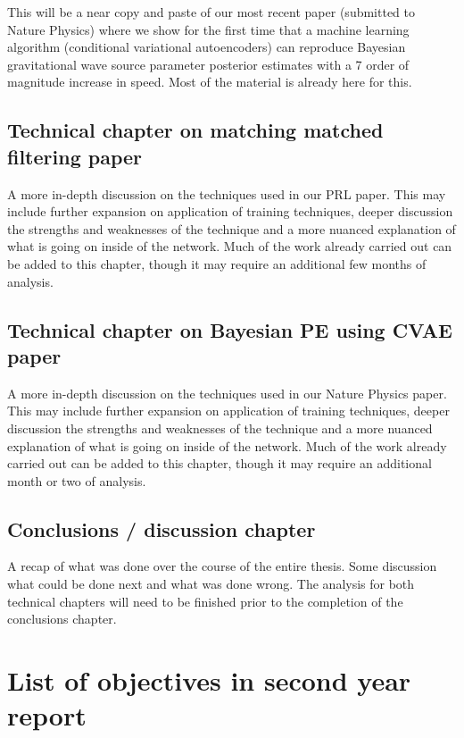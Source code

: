 This will be a near copy and paste of our most recent paper (submitted to Nature Physics) where we show for the first time that a machine learning algorithm (conditional variational autoencoders) can reproduce Bayesian gravitational wave source parameter posterior estimates with a 7 order of magnitude increase in speed. Most of the material is already here for this.

\section{Technical chapter on matching matched filtering paper}

A more in-depth discussion on the techniques used in our PRL paper. This may include further expansion on application of training techniques, deeper discussion the strengths and weaknesses of the technique and a more nuanced explanation of what is going on inside of the network. Much of the work already carried out can be added to this chapter, though it may require an additional few months of analysis.

\section{Technical chapter on Bayesian PE using CVAE paper}

A more in-depth discussion on the techniques used in our Nature Physics paper. This may include further expansion on application of training techniques, deeper discussion the strengths and weaknesses of the technique and a more nuanced explanation of what is going on inside of the network. Much of the work already carried out can be added to this chapter, though it may require an additional month or two of analysis.

\section{Conclusions / discussion chapter}

A recap of what was done over the course of the entire thesis. Some discussion what could be done next and what was done wrong. The analysis for both technical chapters will need to be finished prior to the completion of the conclusions chapter.

%
%

\chapter{List of objectives in second year report}

